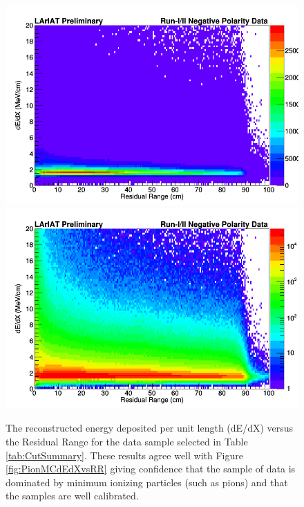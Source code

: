 \begin{figure}[h!]
\centering
\includegraphics[scale=0.33]{./images/dEdXvsRRData.png}
\includegraphics[scale=0.33]{./images/dEdXvsRRDataLog.png}
\caption{The reconstructed energy deposited per unit length (dE/dX) versus the Residual  Range for the data sample selected in Table \ref{tab:CutSummary}. These results agree well with Figure \ref{fig:PionMCdEdXvsRR} giving confidence that the sample of data is dominated by minimum ionizing particles (such as pions) and that the samples are well calibrated.}
\label{fig:DatadEdXvsRR}
\end{figure}

